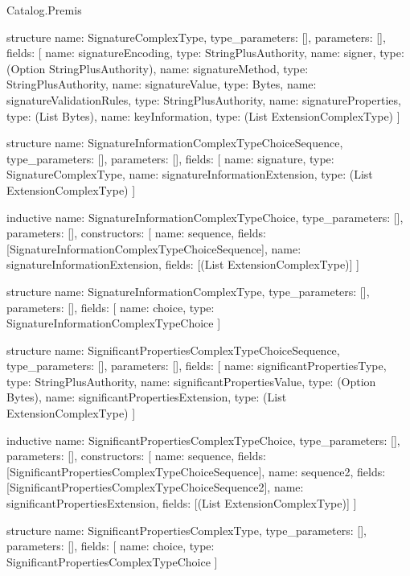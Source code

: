 \begin{lexlean}{Catalog.Premis}
\begin{semanticmodule}
structure{
  name: SignatureComplexType,
  type_parameters: [],
  parameters: [],
  fields: [
    {name: signatureEncoding, type: StringPlusAuthority},
    {name: signer, type: (Option StringPlusAuthority)},
    {name: signatureMethod, type: StringPlusAuthority},
    {name: signatureValue, type: Bytes},
    {name: signatureValidationRules, type: StringPlusAuthority},
    {name: signatureProperties, type: (List Bytes)},
    {name: keyInformation, type: (List ExtensionComplexType)}
  ]
}

structure{
  name: SignatureInformationComplexTypeChoiceSequence,
  type_parameters: [],
  parameters: [],
  fields: [
    {name: signature, type: SignatureComplexType},
    {name: signatureInformationExtension, type: (List ExtensionComplexType)}
  ]
}

inductive{
  name: SignatureInformationComplexTypeChoice,
  type_parameters: [],
  parameters: [],
  constructors: [
    {name: sequence, fields: [SignatureInformationComplexTypeChoiceSequence]},
    {name: signatureInformationExtension, fields: [(List ExtensionComplexType)]}
  ]
}

structure{
  name: SignatureInformationComplexType,
  type_parameters: [],
  parameters: [],
  fields: [
    {name: choice, type: SignatureInformationComplexTypeChoice}
  ]
}

structure{
  name: SignificantPropertiesComplexTypeChoiceSequence,
  type_parameters: [],
  parameters: [],
  fields: [
    {name: significantPropertiesType, type: StringPlusAuthority},
    {name: significantPropertiesValue, type: (Option Bytes)},
    {name: significantPropertiesExtension, type: (List ExtensionComplexType)}
  ]
}

inductive{
  name: SignificantPropertiesComplexTypeChoice,
  type_parameters: [],
  parameters: [],
  constructors: [
    {name: sequence, fields: [SignificantPropertiesComplexTypeChoiceSequence]},
    {name: sequence2, fields: [SignificantPropertiesComplexTypeChoiceSequence2]},
    {name: significantPropertiesExtension, fields: [(List ExtensionComplexType)]}
  ]
}

structure{
  name: SignificantPropertiesComplexType,
  type_parameters: [],
  parameters: [],
  fields: [
    {name: choice, type: SignificantPropertiesComplexTypeChoice}
  ]
}


\end{semanticmodule}
\end{lexlean}
